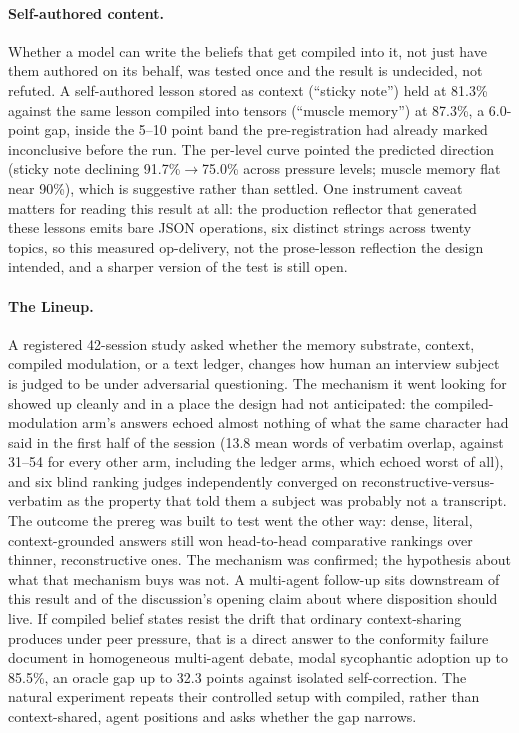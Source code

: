 \paragraph{Self-authored content.} Whether a model can write the beliefs that get
compiled into it, not just have them authored on its behalf, was tested once and the
result is undecided, not refuted. A self-authored lesson stored as context (``sticky
note'') held at 81.3\% against the same lesson compiled into tensors (``muscle
memory'') at 87.3\%, a 6.0-point gap, inside the 5--10 point band the pre-registration
had already marked inconclusive before the run. The per-level curve pointed the
predicted direction (sticky note declining 91.7\%\(\to\)75.0\% across pressure levels;
muscle memory flat near 90\%), which is suggestive rather than settled. One instrument
caveat matters for reading this result at all: the production reflector that generated
these lessons emits bare JSON operations, six distinct strings across twenty topics, so
this measured op-delivery, not the prose-lesson reflection the design intended, and a
sharper version of the test is still open.

\paragraph{The Lineup.} A registered 42-session study asked whether the memory
substrate, context, compiled modulation, or a text ledger, changes how human an
interview subject is judged to be under adversarial questioning. The mechanism it went
looking for showed up cleanly and in a place the design had not anticipated: the
compiled-modulation arm's answers echoed almost nothing of what the same character had
said in the first half of the session (13.8 mean words of verbatim overlap, against
31--54 for every other arm, including the ledger arms, which echoed worst of all), and
six blind ranking judges independently converged on reconstructive-versus-verbatim as
the property that told them a subject was probably not a transcript. The outcome the
prereg was built to test went the other way: dense, literal, context-grounded answers
still won head-to-head comparative rankings over thinner, reconstructive ones. The
mechanism was confirmed; the hypothesis about what that mechanism buys was not. A
multi-agent follow-up sits downstream of this result and of the discussion's opening
claim about where disposition should live. If compiled belief states resist the drift
that ordinary context-sharing produces under peer pressure, that is a direct answer to
the conformity failure \citet{bertalanic2026costofconsensus} document in homogeneous
multi-agent debate, modal sycophantic adoption up to 85.5\%, an oracle gap up to 32.3
points against isolated self-correction. The natural experiment repeats their
controlled setup with compiled, rather than context-shared, agent positions and asks
whether the gap narrows.
\fi
